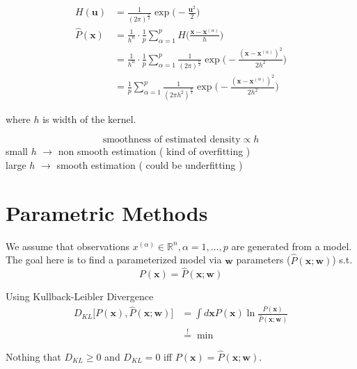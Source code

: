 \begin{align*}
H(\boldsymbol{u}) &= \frac{1}{ (2\pi )^{\frac{n}{2}} }\exp{ \bigg ( - \frac{\boldsymbol{u}^2}{2} \bigg ) }  \\
\hat{P}(\boldsymbol{x}) &= \frac{1}{h^n} \cdot \frac{1}{p} \sum_{\alpha=1}^{p} H\bigg( \frac{\boldsymbol{x} -\boldsymbol{x}^{(\alpha)} }{h}  \bigg ) \\
&= \frac{1}{h^n} \cdot \frac{1}{p} \sum_{\alpha=1}^{p} \frac{1}{ (2\pi )^{\frac{n}{2}} }\exp{ \bigg ( - \frac{(\boldsymbol{x} -\boldsymbol{x}^{(\alpha)})^2}{2h^2} \bigg ) }  \\
&= \frac{1}{p} \sum_{\alpha=1}^{p} \frac{1}{ (2\pi h^2 )^{\frac{n}{2}} }\exp{ \bigg ( - \frac{(\boldsymbol{x} -\boldsymbol{x}^{(\alpha)})^2}{2h^2} \bigg ) } 
\end{align*}

where $h$ is width of the kernel.

$$
\text{smoothness of estimated density} \propto h
$$
small $h$ $\rightarrow $ non smooth estimation ( kind of overfitting )\\
large $h$ $\rightarrow $ smooth estimation ( could be underfitting )

\section{Parametric Methods}

We assume that observations $x^{(\alpha)} \in \mathbb{R}^n, \alpha=1,\dots, p$ are generated from a model. The goal here is to find a parameterized model via $\boldsymbol{w}$ parameters ($\hat{P}(\boldsymbol{x};\boldsymbol{w} )$)  s.t. 
$$
P( \boldsymbol{x}  ) = \hat{P} ( \boldsymbol{x}; \boldsymbol{w} )
$$

Using Kullback-Leibler Divergence 
\begin{align*}
D_{KL} \bigg [ P( \boldsymbol{x}  ), \hat{P} ( \boldsymbol{x}; \boldsymbol{w} )  \bigg] &= \int d\boldsymbol{x} P( \boldsymbol{x}  ) \ln \frac{P( \boldsymbol{x}  )}{ \hat{P} ( \boldsymbol{x}; \boldsymbol{w} )   } \\
&\stackrel{!}{=}	 \min
\end{align*}

Nothing that $D_{KL} \ge 0$ and $D_{KL} = 0$ iff $P( \boldsymbol{x}  ) = \hat{P} ( \boldsymbol{x}; \boldsymbol{w} )$.

